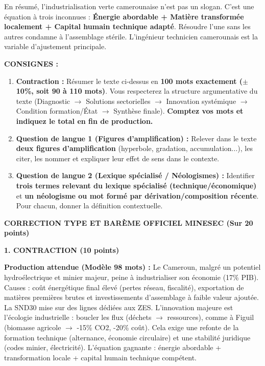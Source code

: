 \documentclass[11pt]{article}
\begin{document}
\begin{exoresolu}
En résumé, l'industrialisation verte camerounaise n'est pas un slogan. C'est une équation à trois inconnues : \textbf{Énergie abordable + Matière transformée localement + Capital humain technique adapté}. Résoudre l'une sans les autres condamne à l'assemblage stérile. L'ingénieur technicien camerounais est la variable d'ajustement principale.

\vspace{0.5cm}
\textbf{CONSIGNES :}
\begin{enumerate}
\item \textbf{Contraction :} Résumer le texte ci-dessus en \textbf{100 mots exactement ($\pm$10\%, soit 90 à 110 mots)}. Vous respecterez la structure argumentative du texte (Diagnostic $\to$ Solutions sectorielles $\to$ Innovation systémique $\to$ Condition formation/État $\to$ Synthèse finale). \textbf{Comptez vos mots et indiquez le total en fin de production.}
\item \textbf{Question de langue 1 (Figures d'amplification) :} Relever dans le texte \textbf{deux figures d'amplification} (hyperbole, gradation, accumulation...), les citer, les nommer et expliquer leur effet de sens dans le contexte.
\item \textbf{Question de langue 2 (Lexique spécialisé / Néologismes) :} Identifier \textbf{trois termes relevant du lexique spécialisé (technique/économique)} et \textbf{un néologisme ou mot formé par dérivation/composition récente}. Pour chacun, donner la définition contextuelle.
\end{enumerate}

\tcblower
\textbf{CORRECTION TYPE ET BARÈME OFFICIEL MINESEC (Sur 20 points)}

\textbf{1. CONTRACTION (10 points)}

\textbf{Production attendue (Modèle 98 mots) :}
Le Cameroun, malgré un potentiel hydroélectrique et minier majeur, peine à industrialiser son économie (17\% PIB). Causes : coût énergétique final élevé (pertes réseau, fiscalité), exportation de matières premières brutes et investissements d'assemblage à faible valeur ajoutée. La SND30 mise sur des lignes dédiées aux ZES. L'innovation majeure est l'écologie industrielle : boucler les flux (déchets $\to$ ressources), comme à Figuil (biomasse agricole $\to$ -15\% CO2, -20\% coût). Cela exige une refonte de la formation technique (alternance, économie circulaire) et une stabilité juridique (codes minier, électricité). L'équation gagnante : énergie abordable + transformation locale + capital humain technique compétent.


\end{exoresolu}
\end{document}
